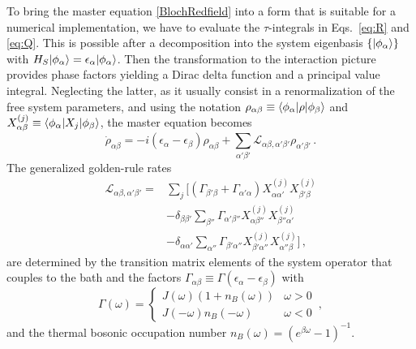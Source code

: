 \documentclass[twocolumn,prb,showpacs]{revtex4-1}
\DeclarePairedDelimiter\bra{\langle}{\rvert}
\DeclarePairedDelimiter\ket{\lvert}{\rangle}
\begin{document}
To bring the master equation \eqref{BlochRedfield} into a form that is
suitable for a numerical implementation, we have to evaluate the
$\tau$-integrals in Eqs.~\eqref{eq:R} and \eqref{eq:Q}.  This is possible
after a decomposition into the system eigenbasis $\{\ket{\phi_\alpha}\}$
with $H_S\ket{\phi_\alpha} =\epsilon_\alpha\ket{\phi_\alpha}$.  Then the
transformation to the interaction picture provides phase factors yielding a
Dirac delta function and a principal value integral. Neglecting the latter,
as it usually consist in a renormalization of the free system parameters,
and using the notation ${\rho_{\alpha\beta}\equiv\bra{\phi_\alpha} \rho
\ket{\phi_\beta}}$ and ${X^{(j)}_{\alpha\beta}\equiv\bra{\phi_\alpha} X_j
\ket{\phi_\beta}}$, the master equation becomes
\begin{equation}
\dot{\rho}_{\alpha\beta}=-i(\epsilon_\alpha-\epsilon_\beta)\rho_{\alpha\beta} 
+ \sum_{\alpha'\beta'}\mathcal{L}_{\alpha\beta,\alpha'\beta'} 
\rho_{\alpha'\beta'} \,. \label{eq:mastereq}
\end{equation}
The generalized golden-rule rates
\begin{equation}
\begin{split}
\mathcal{L}_{\alpha\beta,\alpha'\beta'} ={}& \sum_j \Big[(\Gamma_{\beta'\beta}
    +\Gamma_{\alpha'\alpha})X^{(j)}_{\alpha\alpha'}X^{(j)}_{\beta'\beta}
    \\ &
    - \delta_{\beta\beta'}\sum_{\beta''}
    \Gamma_{\alpha'\beta''}X^{(j)}_{\alpha\beta''}X^{(j)}_{\beta''\alpha'}
    \\ &
    - \delta_{\alpha\alpha'}\sum_{\alpha''}
    \Gamma_{\beta'\alpha''}X^{(j)}_{\beta'\alpha''}X^{(j)}_{\alpha''\beta} 
    \Big] \,,
\end{split}
\end{equation}
are determined by the transition matrix elements of the system operator
that couples to the bath and the factors
${\Gamma_{\alpha \beta} \equiv \Gamma(\epsilon_\alpha-\epsilon_\beta)}$
with
\begin{equation}
\Gamma(\omega)=\begin{cases} J(\omega)(1+n_B(\omega)) & \omega>0 \\
                             J(-\omega)n_B(-\omega) & \omega<0
\end{cases} \,,
\end{equation}
and the thermal bosonic occupation number $n_B(\omega)=(e^{\beta\omega}-1)^{-1}$. 
\end{document}
